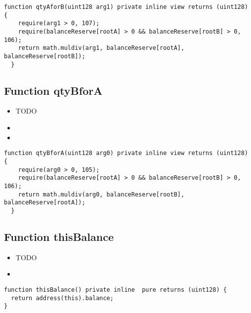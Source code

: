 \begin{lstlisting}[firstnumber=184]
  function qtyAforB(uint128 arg1) private inline view returns (uint128) {
    require(arg1 > 0, 107);
    require(balanceReserve[rootA] > 0 && balanceReserve[rootB] > 0, 106);
    return math.muldiv(arg1, balanceReserve[rootA], balanceReserve[rootB]);
  }
\end{lstlisting}

\subsection{Function qtyBforA}

\begin{itemize}
\item TODO
\item \issueError{}
\item \issueInternal
\end{itemize}

\begin{lstlisting}[firstnumber=177]
  function qtyBforA(uint128 arg0) private inline view returns (uint128) {
    require(arg0 > 0, 105);
    require(balanceReserve[rootA] > 0 && balanceReserve[rootB] > 0, 106);
    return math.muldiv(arg0, balanceReserve[rootB], balanceReserve[rootA]);
  }
\end{lstlisting}

\subsection{Function thisBalance}

\begin{itemize}
\item TODO
\item \issueInternal
\end{itemize}

\begin{lstlisting}[firstnumber=599]
function thisBalance() private inline  pure returns (uint128) {
  return address(this).balance;
}
\end{lstlisting}
